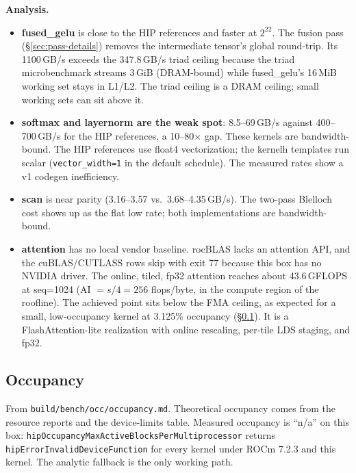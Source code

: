 \documentclass[10pt,twoside]{article}
\begin{document}
\textbf{Analysis.}
\begin{itemize}
  \item \textbf{fused\_gelu} is close to the HIP references and faster at $2^{22}$. The fusion
        pass (\S\ref{sec:pass-details}) removes the intermediate tensor's global round-trip.
        Its 1100\,GB/s exceeds the 347.8\,GB/s triad ceiling because the triad microbenchmark
        streams 3\,GiB (DRAM-bound) while fused\_gelu's 16\,MiB working set stays in L1/L2.
        The triad ceiling is a DRAM ceiling; small working sets can sit above it.
  \item \textbf{softmax and layernorm are the weak spot}: 8.5--69\,GB/s against 400--700\,GB/s
        for the HIP references, a 10--80$\times$ gap. These kernels are bandwidth-bound. The
        HIP references use float4 vectorization; the kernelh templates run scalar
        (\texttt{vector\_width=1} in the default schedule). The measured rates show a v1
        codegen inefficiency.
  \item \textbf{scan} is near parity (3.16--3.57 vs.\ 3.68--4.35\,GB/s). The two-pass
        Blelloch cost shows up as the flat low rate; both implementations are bandwidth-bound.
  \item \textbf{attention} has no local vendor baseline. rocBLAS lacks an attention API, and
        the cuBLAS/CUTLASS rows skip with exit 77 because this box has no NVIDIA driver. The online,
        tiled, fp32 attention reaches about 43.6\,GFLOPS at seq=1024 (AI $= s/4 = 256$
        flops/byte, in the compute region of the roofline). The achieved point sits below the
        FMA ceiling, as expected for a small, low-occupancy kernel at 3.125\% occupancy
        (\S\ref{sec:occupancy}). It is a FlashAttention-lite \cite{flashattn2022,flashattn2}
        realization with online rescaling, per-tile LDS staging, and fp32.
\end{itemize}

\subsection{Occupancy}
\label{sec:occupancy}

From \texttt{build/bench/occ/occupancy.md}. Theoretical occupancy comes from the resource
reports and the device-limits table. Measured occupancy is ``n/a'' on this box:
\texttt{hipOccupancyMaxActive\-Blocks\-Per\-Multiprocessor} returns
\texttt{hipErrorInvalidDeviceFunction} for every kernel under ROCm 7.2.3 and this kernel. The
analytic fallback is the only working path.
\end{document}
